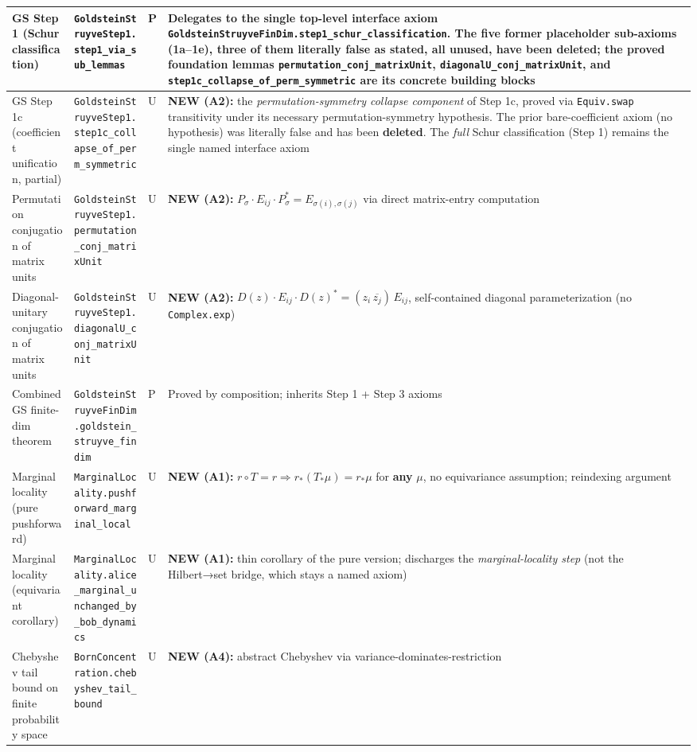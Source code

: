 \documentclass[11pt,a4paper]{article}
\begin{document}
\begin{center}
\begin{tabularx}{\linewidth}{|Y|Y|Y|Y|}
\hline
GS Step 1 (Schur classification) & \texttt{GoldsteinStruyveStep1.step1\_via\_sub\_lemmas} & P & Delegates to the single top-level interface axiom \texttt{GoldsteinStruyveFinDim.step1\_schur\_classification}. The five former placeholder sub-axioms (1a–1e), three of them literally false as stated, all unused, have been \textbf{deleted}; the proved foundation lemmas \texttt{permutation\_conj\_matrixUnit}, \texttt{diagonalU\_conj\_matrixUnit}, and \texttt{step1c\_collapse\_of\_perm\_symmetric} are its concrete building blocks \\
\hline
GS Step 1c (coefficient unification, partial) & \texttt{GoldsteinStruyveStep1.step1c\_collapse\_of\_perm\_symmetric} & U & \textbf{NEW (A2):} the \emph{permutation-symmetry collapse component} of Step 1c, proved via \texttt{Equiv.swap} transitivity under its necessary permutation-symmetry hypothesis. The prior bare-coefficient axiom (no hypothesis) was literally false and has been \textbf{deleted}. The \emph{full} Schur classification (Step 1) remains the single named interface axiom \\
\hline
Permutation conjugation of matrix units & \texttt{GoldsteinStruyveStep1.permutation\_conj\_matrixUnit} & U & \textbf{NEW (A2):} $P_\sigma \cdot E_{ij} \cdot P_\sigma^* = E_{\sigma(i),\sigma(j)}$ via direct matrix-entry computation \\
\hline
Diagonal-unitary conjugation of matrix units & \texttt{GoldsteinStruyveStep1.diagonalU\_conj\_matrixUnit} & U & \textbf{NEW (A2):} $D(z)\cdot E_{ij}\cdot D(z)^* = (z_i\,\overline{z_j})\,E_{ij}$, self-contained diagonal parameterization (no \texttt{Complex.exp}) \\
\hline
Combined GS finite-dim theorem & \texttt{GoldsteinStruyveFinDim.goldstein\_struyve\_findim} & P & Proved by composition; inherits Step 1 + Step 3 axioms \\
\hline
Marginal locality (pure pushforward) & \texttt{MarginalLocality.pushforward\_marginal\_local} & U & \textbf{NEW (A1):} $r\circ T = r \Rightarrow r_*(T_*\mu) = r_*\mu$ for \textbf{any} $\mu$, no equivariance assumption; reindexing argument \\
\hline
Marginal locality (equivariant corollary) & \texttt{MarginalLocality.alice\_marginal\_unchanged\_by\_bob\_dynamics} & U & \textbf{NEW (A1):} thin corollary of the pure version; discharges the \emph{marginal-locality step} (not the Hilbert→set bridge, which stays a named axiom) \\
\hline
Chebyshev tail bound on finite probability space & \texttt{BornConcentration.chebyshev\_tail\_bound} & U & \textbf{NEW (A4):} abstract Chebyshev via variance-dominates-restriction \\

\end{tabularx}
\end{center}
\end{document}
